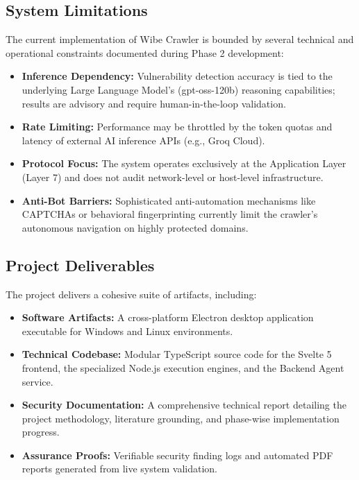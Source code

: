 \documentclass[12pt,oneside,a4paper]{book}
\begin{document}
\subsection{System Limitations}
The current implementation of Wibe Crawler is bounded by several technical and operational constraints documented during Phase 2 development:
\begin{itemize}
    \item \textbf{Inference Dependency:} Vulnerability detection accuracy is tied to the underlying Large Language Model's (gpt-oss-120b) reasoning capabilities; results are advisory and require human-in-the-loop validation.
    \item \textbf{Rate Limiting:} Performance may be throttled by the token quotas and latency of external AI inference APIs (e.g., Groq Cloud).
    \item \textbf{Protocol Focus:} The system operates exclusively at the Application Layer (Layer 7) and does not audit network-level or host-level infrastructure.
    \item \textbf{Anti-Bot Barriers:} Sophisticated anti-automation mechanisms like CAPTCHAs or behavioral fingerprinting currently limit the crawler's autonomous navigation on highly protected domains.
\end{itemize}

\subsection{Project Deliverables}
The project delivers a cohesive suite of artifacts, including:
\begin{itemize}
    \item \textbf{Software Artifacts:} A cross-platform Electron desktop application executable for Windows and Linux environments.
    \item \textbf{Technical Codebase:} Modular TypeScript source code for the Svelte 5 frontend, the specialized Node.js execution engines, and the Backend Agent service.
    \item \textbf{Security Documentation:} A comprehensive technical report detailing the project methodology, literature grounding, and phase-wise implementation progress.
    \item \textbf{Assurance Proofs:} Verifiable security finding logs and automated PDF reports generated from live system validation.
\end{itemize}
\end{document}

